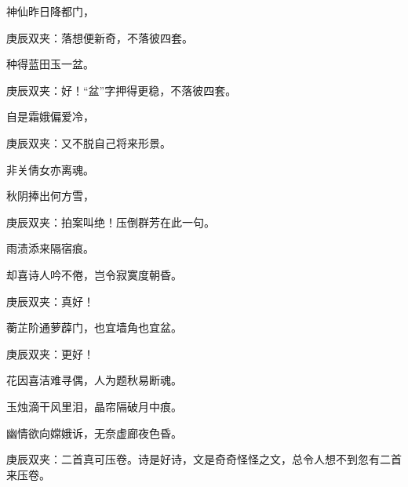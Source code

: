 \begin{poem}
    \begin{pl}神仙昨日降都门，\end{pl}
    \begin{note}庚辰双夹：落想便新奇，不落彼四套。\end{note}
    \begin{pl}种得蓝田玉一盆。\end{pl}
    \begin{note}庚辰双夹：好！“盆”字押得更稳，不落彼四套。\end{note}

    \begin{pl}自是霜娥偏爱冷，\end{pl}
    \begin{note}庚辰双夹：又不脱自己将来形景。\end{note}
    \begin{pl} 非关倩女亦离魂。\end{pl}

    \begin{pl}秋阴捧出何方雪，\end{pl}
    \begin{note}庚辰双夹：拍案叫绝！压倒群芳在此一句。\end{note}
    \begin{pl}雨渍添来隔宿痕。\end{pl}

    \begin{pl}却喜诗人吟不倦，岂令寂寞度朝昏。\end{pl}
    \begin{note}庚辰双夹：真好！\end{note}
    \emptypl

    \begin{pl}蘅芷阶通萝薜门，也宜墙角也宜盆。\end{pl}
    \begin{note}庚辰双夹：更好！\end{note}

    \begin{pl}花因喜洁难寻偶，人为题秋易断魂。\end{pl}

    \begin{pl}玉烛滴干风里泪，晶帘隔破月中痕。\end{pl}

    \begin{pl}幽情欲向嫦娥诉，无奈虚廊夜色昏。\end{pl}
    \begin{note}庚辰双夹：二首真可压卷。诗是好诗，文是奇奇怪怪之文，总令人想不到忽有二首来压卷。\end{note}
\end{poem}


